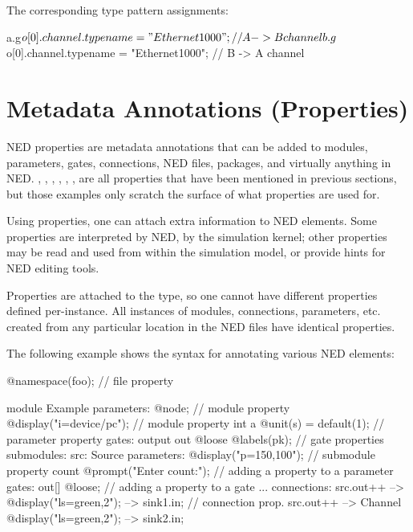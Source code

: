The corresponding type pattern assignments:

\begin{ned}
a.g$o[0].channel.typename = "Ethernet1000";  // A -> B channel
b.g$o[0].channel.typename = "Ethernet1000";  // B -> A channel
\end{ned}


\section{Metadata Annotations (Properties)}
\label{sec:ned-lang:properties}

NED properties are metadata annotations that can be added to modules, parameters,
gates, connections, NED files, packages, and virtually anything in NED.
, , , , ,
,  are all properties that have been mentioned in
previous sections, but those examples only scratch the surface of what
properties are used for.


Using properties, one can attach extra information to NED elements. Some
properties are interpreted by NED, by the simulation kernel; other
properties may be read and used from within the simulation model, or
provide hints for NED editing tools.

Properties are attached to the type, so one cannot have different
properties defined per-instance. All instances of modules, connections,
parameters, etc. created from any particular location in the NED files have
identical properties.

The following example shows the syntax for annotating various NED elements:

\begin{ned}
@namespace(foo);  // file property

module Example
{
    parameters:
       @node;   // module property
       @display("i=device/pc");   // module property
       int a @unit(s) = default(1); // parameter property
    gates:
       output out @loose @labels(pk);  // gate properties
    submodules:
       src: Source {
           parameters:
              @display("p=150,100");  // submodule property
              count @prompt("Enter count:"); // adding a property to a parameter
           gates:
              out[] @loose;  // adding a property to a gate
       }
       ...
    connections:
       src.out++ --> { @display("ls=green,2"); } --> sink1.in; // connection prop.
       src.out++ --> Channel { @display("ls=green,2"); } --> sink2.in;
}
\end{ned}


